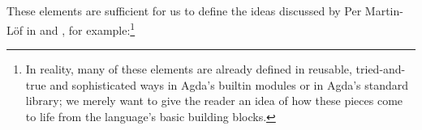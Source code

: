 {\begin{code}%
\>[0]\AgdaSpace{}%
\AgdaSpace{}%
\<%
\\
%
\\[\AgdaEmptyExtraSkip]%
\>[0]\AgdaSpace{}%
\AgdaSpace{}%
\AgdaSymbol{\{}\AgdaSpace{}%
\AgdaSymbol{:}\AgdaSpace{}%
\AgdaSymbol{\}}\AgdaSpace{}%
\AgdaSymbol{(}\AgdaSpace{}%
\AgdaSymbol{:}\AgdaSpace{}%
\AgdaSpace{}%
\AgdaSymbol{)}\AgdaSpace{}%
\AgdaSymbol{:}\AgdaSpace{}%
\AgdaSpace{}%
\AgdaSpace{}%
\<%
\\
\>[0][@{}l@{\AgdaIndent{0}}]%
\>[2]\AgdaInductiveConstructor{[]}%
\>[7]\AgdaSymbol{:}\AgdaSpace{}%
\AgdaSpace{}%
\<%
\\
%
\>[2]\AgdaOperator{\AgdaInductiveConstructor{\AgdaUnderscore{}::\AgdaUnderscore{}}}\AgdaSpace{}%
\AgdaSymbol{:}\AgdaSpace{}%
\AgdaSpace{}%
\AgdaSpace{}%
\AgdaSpace{}%
\AgdaSpace{}%
\AgdaSpace{}%
\AgdaSpace{}%
\<%
\end{code}

These elements are sufficient for us to define the ideas discussed by Per Martin-Löf in \cite{Martin-Lof1980IntuitionisticTheory} and \cite{Martin-Lof1982ConstructiveProgramming}, for example:\footnote{In reality, many of these elements are already defined in reusable, tried-and-true and sophisticated ways in Agda's builtin modules or in Agda's standard library; we merely want to give the reader an idea of how these pieces come to life from the language's basic building blocks.}

}
